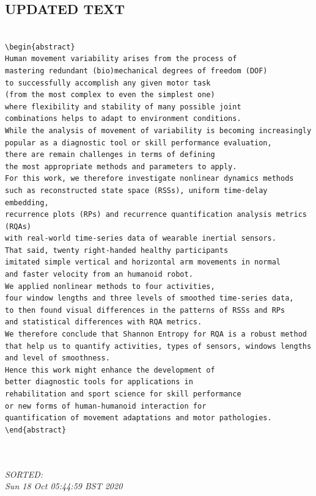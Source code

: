 \documentclass[10pt]{article}
\begin{document}
\subsection{UPDATED TEXT}
\begin{verbatim}

\begin{abstract}
Human movement variability arises from the process of 
mastering redundant (bio)mechanical degrees of freedom (DOF)
to successfully accomplish any given motor task
(from the most complex to even the simplest one) 
where flexibility and stability of many possible joint 
combinations helps to adapt to environment conditions. 
While the analysis of movement of variability is becoming increasingly 
popular as a diagnostic tool or skill performance evaluation, 
there are remain challenges in terms of defining 
the most appropriate methods and parameters to apply. 
For this work, we therefore investigate nonlinear dynamics methods 
such as reconstructed state space (RSSs), uniform time-delay embedding, 
recurrence plots (RPs) and recurrence quantification analysis metrics (RQAs)
with real-world time-series data of wearable inertial sensors. 
That said, twenty right-handed healthy participants 
imitated simple vertical and horizontal arm movements in normal 
and faster velocity from an humanoid robot.
We applied nonlinear methods to four activities, 
four window lengths and three levels of smoothed time-series data,
to then found visual differences in the patterns of RSSs and RPs
and statistical differences with RQA metrics.
We therefore conclude that Shannon Entropy for RQA is a robust method 
that help us to quantify activities, types of sensors, windows lengths 
and level of smoothness.
Hence this work might enhance the development of 
better diagnostic tools for applications in 
rehabilitation and sport science for skill performance
or new forms of human-humanoid interaction for
quantification of movement adaptations and motor pathologies.
\end{abstract}



\end{verbatim}


\textit{
SORTED: \\ 
Sun 18 Oct 05:44:59 BST 2020 \\
}
\\
\end{document}
